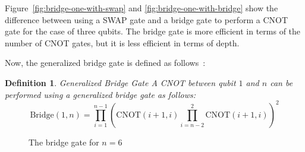 \documentclass{report}
\newtheorem{definition}{Definition}
\begin{document}
Figure~\ref{fig:bridge-one-with-swap} and \ref{fig:bridge-one-with-bridge} show the difference between using a SWAP gate and a bridge gate to perform a CNOT gate for the case of three qubits. The bridge gate is more efficient in terms of the number of CNOT gates, but it is less efficient in terms of depth.

Now, the generalized bridge gate is defined as follows~\cite{nash2020}:

\begin{definition}{Generalized Bridge Gate}
  A CNOT between qubit $1$ and $n$ can be performed using a generalized bridge gate as follows:
  \begin{equation} \mathrm{Bridge}(1, n) = \prod_{i=1}^{n - 1}(\mathrm{CNOT}(i + 1, i) \prod_{i=n - 2}^{2}\mathrm{CNOT}(i + 1, i))^2
  \end{equation}
\end{definition}


\def\qceq{\midstick[6,brackets=none]{=}}
\begin{figure}[h]
  \centering
{}
  \caption{The bridge gate for $n=6$}
\end{figure}
\end{document}
